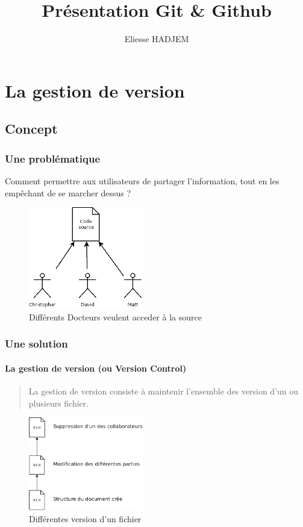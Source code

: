 \documentclass{beamer}
\title{Présentation Git \& Github}
\author{Eliesse HADJEM}
\begin{document}
  \begin{frame}
    \maketitle
  \end{frame}
  
  \begin{frame}
    \tableofcontents
  \end{frame}

\section{La gestion de version}
\subsection{Concept}
\begin{frame}
 \frametitle{Une problématique}
    Comment permettre aux utilisateurs de partager l'information, tout en les empêchant de se marcher dessus ?
    \begin{figure}
 \centering
 \includegraphics[width=50mm]{./Img/AccesConc.png}
 \caption{Différents Docteurs veulent acceder à la source}
\end{figure}


\end{frame}
\begin{frame}
 \frametitle{Une solution}
  \framesubtitle{La gestion de version (ou Version Control)}
    \begin{quote}
     La gestion de version consiste à maintenir l'ensemble des version d'un ou plusieurs fichier. 
    \end{quote}
    \begin{figure}
 \centering
 \includegraphics[width=50mm]{./Img/VersionsFich.png}
 \caption{Différentes version d'un fichier}
\end{figure}
    
\end{frame}
\end{document}
